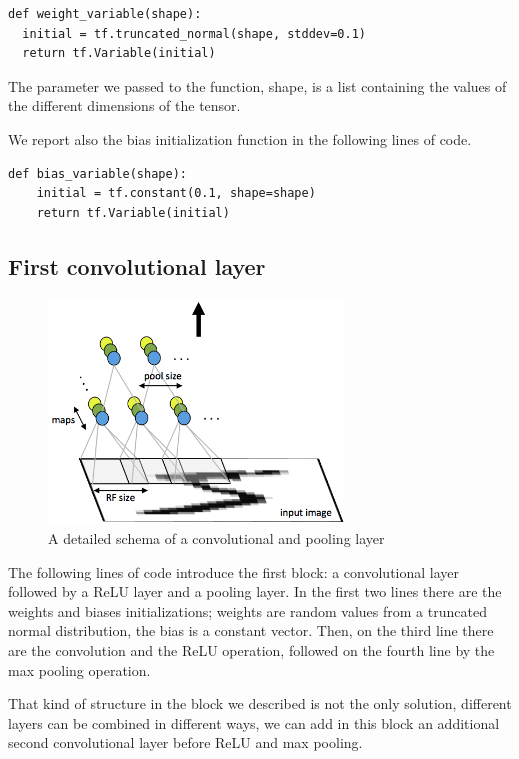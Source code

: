 \begin{lstlisting}
def weight_variable(shape):
  initial = tf.truncated_normal(shape, stddev=0.1)
  return tf.Variable(initial)
\end{lstlisting}

The parameter we passed to the function, shape, is a list containing the values of the different dimensions of the tensor.

We report also the bias initialization function in the following lines of code.

\begin{lstlisting}
def bias_variable(shape):
	initial = tf.constant(0.1, shape=shape)
	return tf.Variable(initial)
\end{lstlisting}

\subsection{First convolutional layer}

\begin{figure}
	\centering
	\includegraphics[width=0.7\textwidth]{Images/conv_layer}
	\caption{A detailed schema of a convolutional and pooling layer}
	\label{fig:conv_layer}
\end{figure}

The following lines of code introduce the first block: a convolutional layer followed by a \acs{ReLU} layer and a pooling layer. In the first two lines there are the weights and biases initializations; weights are random values from a truncated normal distribution, the bias is a constant vector. Then, on the third line there are the convolution and the \acs{ReLU} operation, followed on the fourth line by the max pooling operation.

That kind of structure in the block we described is not the only solution, different layers can be combined in different ways, \eg we can add in this block an additional second convolutional layer before ReLU and max pooling.

